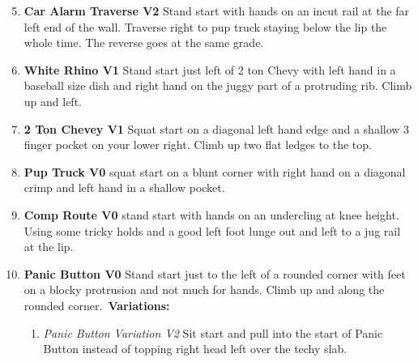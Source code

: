 \begin{multicols*}{2}
				\begin{enumerate}[]
					\setcounter{enumi}{4}
					\item\label{rt:Car Alarm Traverse} \colorbox{green!20}{\textbf{Car Alarm Traverse V2 \ding{72}   } }
					\newline Stand start with hands on an incut rail at the far left end of the wall. Traverse right to pup truck staying below the lip the whole time. The reverse goes at the same grade.\
					\setcounter{enumi}{5}
					\item\label{rt:White Rhino} \colorbox{green!20}{\textbf{White Rhino V1   } }
					\newline Stand start just left of 2 ton Chevy with left hand in a baseball size dish and right hand on the juggy part of a protruding rib. Climb up and left.\
					\setcounter{enumi}{6}
					\item\label{rt:2 Ton Chevey} \colorbox{green!20}{\textbf{2 Ton Chevey V1    } }
					\newline Squat start on a diagonal left hand edge and a shallow 3 finger pocket on your lower right. Climb up two flat ledges to the top.\
					\setcounter{enumi}{7}
					\item\label{rt:Pup Truck} \colorbox{green!20}{\textbf{Pup Truck V0  \ding{72}  } }
					\newline squat start on a blunt corner with right hand on a diagonal crimp and left hand in a shallow pocket.\
					\setcounter{enumi}{8}
					\item\label{rt:Comp Route} \colorbox{green!20}{\textbf{Comp Route V0   } }
					\newline stand start with hands on an undercling at knee height. Using some tricky holds and a good left foot lunge out and left to a jug rail at the lip.\
					\setcounter{enumi}{9}
					\item\label{rt:Panic Button} \colorbox{green!20}{\textbf{Panic Button V0 \ding{72}  } }
					\newline Stand start just to the left of a rounded corner with feet on a blocky protrusion and not much for hands. Climb up and along the rounded corner.\
					\newline \textbf{Variations:}
					\begin{enumerate}
						\item\label{vr:Panic Button Variation} \colorbox{green!20}{\emph{Panic Button Variation V2 \ding{72} \ding{72}  }  }
						\newline Sit start and pull into the start of Panic Button instead of topping right head left over the techy slab.\
					\end{enumerate}
				\end{enumerate}

\end{multicols*}
